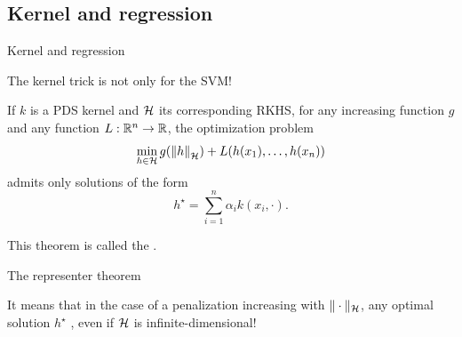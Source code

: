 \documentclass[xcolor={usenames,dvipsnames}]{beamer}
\begin{document}
\subsection{Kernel and regression}

\begin{frame}{Kernel and regression}

 \alert{The kernel trick is not only for the SVM!}

  \bigskip

\begin{theorem}

If $k$ is a PDS kernel and $\mathcal{H}$ its corresponding RKHS, for any increasing function $g$ and any function $L : \mathbb{R}^n \rightarrow \mathbb{R}$, the optimization problem
  \begin{equation*}
    \min_{h \in \mathcal{H}} g(\left\| h \right\|_{\mathcal{H}}) + L(h(x_1), \ldots, h(x_n))
  \end{equation*}
  admits only solutions of the form
  \begin{equation*}
    h^\star = \sum_{i=1}^n \alpha_i k(x_i, \cdot).
  \end{equation*}
\end{theorem}

This theorem is called the .
\end{frame}

\begin{frame}{The representer theorem}

It means that in the case of a penalization increasing with $\|\cdot\|_{\mathcal{H}}$, any optimal solution $h^\star$ , even if $\mathcal{H}$ is infinite-dimensional!
\end{frame}
  
\end{document}
